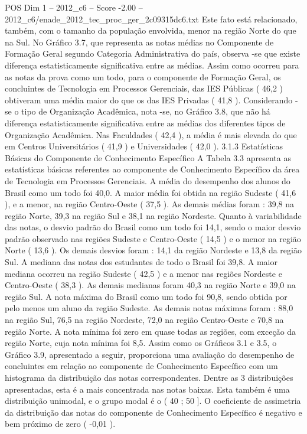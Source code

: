 \begin{textsample}{POS Dim 1 – 2012\_c6 – Score -2.00 – 2012\_c6/enade\_2012\_tec\_proc\_ger\_2c09315dc6.txt}
Este fato está relacionado, também, com o tamanho da população envolvida, menor na região Norte do que na Sul.
No Gráfico 3.7, que representa as notas médias no Componente de Formação Geral segundo Categoria Administrativa do país, observa -se que existe diferença estatisticamente significativa entre as médias.
Assim como ocorreu para as notas da prova como um todo, para o componente de Formação Geral, os concluintes de Tecnologia em Processos Gerenciais, das IES Públicas ( 46,2 ) obtiveram uma média maior do que os das IES Privadas ( 41,8 ).
Considerando -se o tipo de Organização Acadêmica, nota -se, no Gráfico 3.8, que não há diferença estatisticamente significativa entre as médias dos diferentes tipos de Organização Acadêmica.
Nas Faculdades ( 42,4 ), a média é mais elevada do que em Centros Universitários ( 41,9 ) e Universidades ( 42,0 ). 3.1.3 Estatísticas Básicas do Componente de Conhecimento Específico A Tabela 3.3 apresenta as estatísticas básicas referentes ao componente de Conhecimento Específico da área de Tecnologia em Processos Gerenciais.
A média do desempenho dos alunos do Brasil como um todo foi 40,0.
A maior média foi obtida na região Sudeste ( 41,6 ), e a menor, na região Centro-Oeste ( 37,5 ).
As demais médias foram : 39,8 na região Norte, 39,3 na região Sul e 38,1 na região Nordeste.
Quanto à variabilidade das notas, o desvio padrão do Brasil como um todo foi 14,1, sendo o maior desvio padrão observado nas regiões Sudeste e Centro-Oeste ( 14,5 ) e o menor na região Norte ( 13,6 ).
Os demais desvios foram : 14,1 da região Nordeste e 13,8 da região Sul.
A mediana das notas dos estudantes de todo o Brasil foi 39,8.
A maior mediana ocorreu na região Sudeste ( 42,5 ) e a menor nas regiões Nordeste e Centro-Oeste ( 38,3 ).
As demais medianas foram 40,3 na região Norte e 39,0 na região Sul.
A nota máxima do Brasil como um todo foi 90,8, sendo obtida por pelo menos um aluno da região Sudeste.
As demais notas máximas foram : 88,0 na região Sul, 76,5 na região Nordeste, 72,0 na região Centro-Oeste e 70,8 na região Norte.
A nota mínima foi zero em quase todas as regiões, com exceção da região Norte, cuja nota mínima foi 8,5.
Assim como os Gráficos 3.1 e 3.5, o Gráfico 3.9, apresentado a seguir, proporciona uma avaliação do desempenho de concluintes em relação ao componente de Conhecimento Específico com um histograma da distribuição das notas correspondentes.
Dentre as 3 distribuições apresentadas, esta é a mais concentrada nas notas baixas.
Esta também é uma distribuição unimodal, e o grupo modal é o ( 40 ; 50 ].
O coeficiente de assimetria da distribuição das notas do componente de Conhecimento Específico é negativo e bem próximo de zero ( -0,01 ).

\end{textsample}
